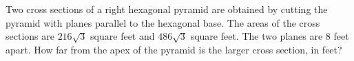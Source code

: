 Two cross sections of a right hexagonal pyramid are obtained by cutting the pyramid with planes parallel to the hexagonal base. The areas of the cross sections are $216\sqrt3$ square feet and $486\sqrt3$ square feet. The two planes are $8$ feet apart. How far from the apex of the pyramid is the larger cross section, in feet?
